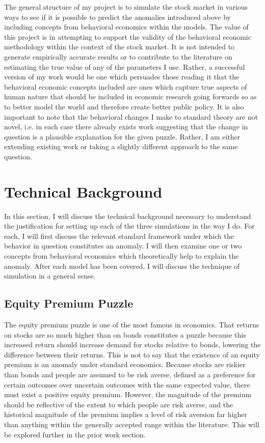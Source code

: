 \documentclass[10pt,twocolumn]{article}
\begin{document}
The general structure of my project is to simulate the stock market in various ways to see if it is possible to predict the anomalies introduced above by including concepts from behavioral economics within the models. The value of this project is in attempting to support the validity of the behavioral economic methodology within the context of the stock market. It is not intended to generate empirically accurate results or to contribute to the literature on estimating the true value of any of the parameters I use. Rather, a successful version of my work would be one which persuades those reading it that the behavioral economic concepts included are ones which capture true aspects of human nature that should be included in economic research going forwards so as to better model the world and therefore create better public policy. It is also important to note that the behavioral changes I make to standard theory are not novel, i.e. in each case there already exists work suggesting that the change in question is a plausible explanation for the given puzzle. Rather, I am either extending existing work or taking a slightly different approach to the same question.

\section{Technical Background}
In this section, I will discuss the technical background necessary to understand the justification for setting up each of the three simulations in the way I do. For each, I will first discuss the relevant standard framework under which the behavior in question constitutes an anomaly. I will then examine one or two concepts from behavioral economics which theoretically help to explain the anomaly. After each model has been covered, I will discuss the technique of simulation in a general sense.  

\subsection{Equity Premium Puzzle}
The equity premium puzzle is one of the most famous in economics. That returns on stocks are so much higher than on bonds constitutes a puzzle because this increased return should increase demand for stocks relative to bonds, lowering the difference between their returns. This is not to say that the existence of an equity premium is an anomaly under standard economics. Because stocks are riskier than bonds and people are assumed to be risk averse, defined as a preference for certain outcomes over uncertain outcomes with the same expected value, there must exist a positive equity premium. However, the magnitude of the premium should be reflective of the extent to which people are risk averse, and the historical magnitude of the premium implies a level of risk aversion far higher than anything within the generally accepted range within the literature. This will be explored further in the prior work section. 
\end{document}
